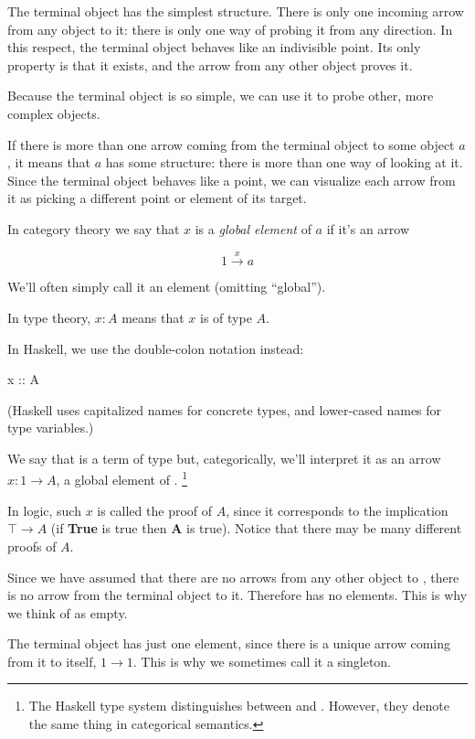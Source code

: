 \documentclass[DaoFP]{subfiles}
\begin{document}
The terminal object has the simplest structure. There is only one incoming arrow from any object to it: there is only one way of probing it from any direction. In this respect, the terminal object behaves like an indivisible point. Its only property is that it exists, and the arrow from any other object proves it. 

Because the terminal object is so simple, we can use it to probe other, more complex objects. 

If there is more than one arrow coming from the terminal object to some object $a$, it means that $a$ has some structure: there is more than one way of looking at it. Since the terminal object behaves like a point, we can visualize each arrow from it as picking a different point or element of its target. 

In category theory we say that $ x$ is a \emph{global element} of $a$ if it's an arrow

\[ 1 \xrightarrow x a \]

We'll often simply call it an element (omitting ``global'').

In type theory, $ x \colon A$ means that $x$ is of type $A$.

In Haskell, we use the double-colon notation instead:
\begin{haskell}
x :: A
\end{haskell}
(Haskell uses capitalized names for concrete types, and lower-cased names for type variables.)

We say that  is a term of type  but, categorically, we'll interpret it as an arrow $x : 1 \to A$, a global element of . \footnote{The Haskell type system distinguishes between  and . However, they denote the same thing in categorical semantics.}

In logic, such $ x$ is called the proof of $ A$, since it corresponds to the implication $ \top \to A$ (if \textbf{True} is true then \textbf{A} is true). Notice that there may be many different proofs of $A$.

Since we have assumed that there are no arrows from any other object to , there is no arrow from the terminal object to it. Therefore  has no elements. This is why we think of  as empty.

The terminal object has just one element, since there is a unique arrow coming from it to itself, $ 1 \to 1$. This is why we sometimes call it a singleton. 
\end{document}
